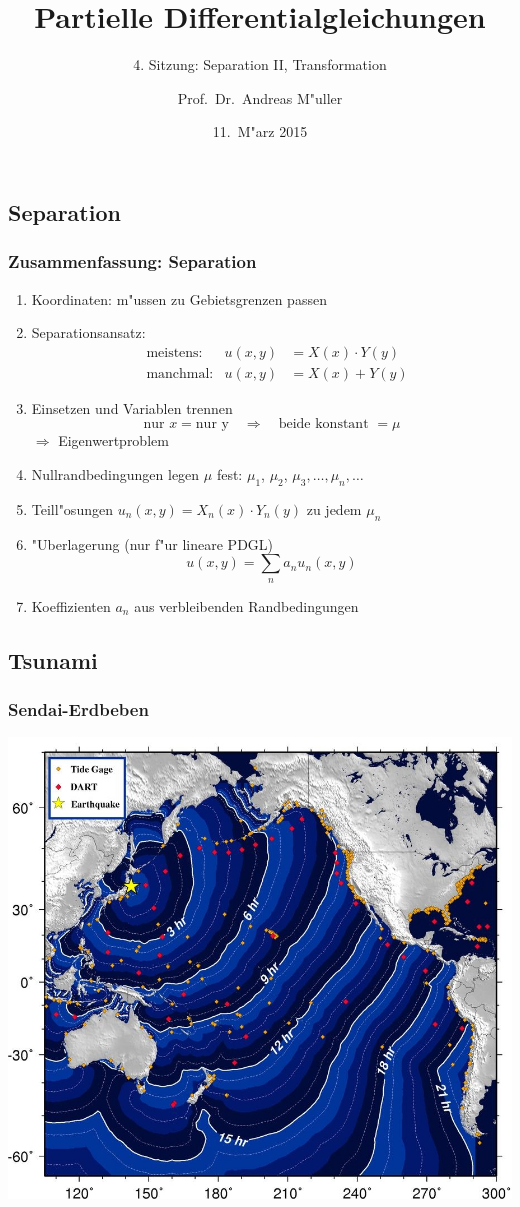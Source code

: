 \documentclass{beamer}
\title[]{Partielle Differentialgleichungen}
\subtitle{4. Sitzung: Separation II, Transformation}
\date[11.~M"arz 2015]{11.~M"arz 2015}
\author{Prof.~Dr.~Andreas M"uller}
\begin{document}
\begin{frame}
\section{Separation}
\titlepage
\end{frame}

\begin{frame}
\frametitle{Zusammenfassung: Separation}
\begin{enumerate}[<+->]
\item Koordinaten: m"ussen zu Gebietsgrenzen passen
\item Separationsansatz: 
\begin{align*}
&\text{meistens:}&u(x,y)&=X(x)\cdot Y(y)\\
&\text{manchmal:}&u(x,y)&=X(x)+Y(y)
\end{align*}
\item Einsetzen und Variablen trennen
\[
\text{nur $x$} = \text{nur y}\quad\Rightarrow\quad \text{beide konstant $=\mu$}
\]
$\Rightarrow$ Eigenwertproblem
\item Nullrandbedingungen legen $\mu$ fest: $\mu_1$, $\mu_2$,
$\mu_3,\dots,\mu_n,\dots$
\item Teill"osungen $u_n(x,y)=X_n(x)\cdot Y_n(y)$  zu jedem $\mu_n$
\item "Uberlagerung (nur f"ur lineare PDGL)
\[
u(x,y)=\sum_n a_nu_n(x,y)
\]
\item Koeffizienten $a_n$ aus verbleibenden Randbedingungen
\end{enumerate}
\end{frame}

\begin{frame}
\section{Tsunami}
\frametitle{Sendai-Erdbeben}
\begin{center}
\includegraphics[width=0.85\hsize]{../../skript/graphics/sendainoaa.jpg}
\end{center}
\end{frame}
\end{document}
